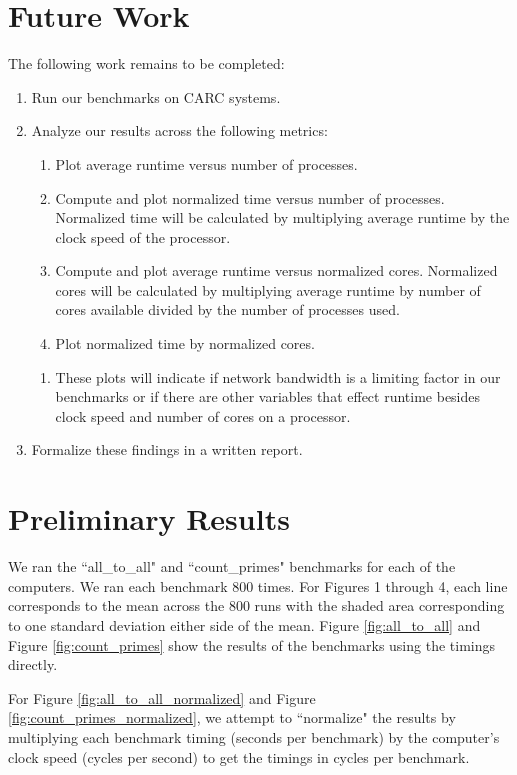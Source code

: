 \documentclass{article}
\begin{document}
\section{Future Work}
The following work remains to be completed:
\begin{enumerate}
    \item Run our benchmarks on CARC systems.
    \item Analyze our results across the following metrics:
    \begin{enumerate}
        \item Plot average runtime versus number of processes.
        \item Compute and plot normalized time versus  number of processes. Normalized time will be calculated by multiplying average runtime by the clock speed of the processor.
        \item Compute and plot average runtime versus normalized cores. Normalized cores will be calculated by multiplying average runtime by number of cores available divided by the number of processes used.
        \item Plot normalized time by normalized cores.
    \end{enumerate}
    \begin{enumerate}
        \item These plots will indicate if network bandwidth is a limiting factor in our benchmarks or if there are other variables that effect runtime besides clock speed and number of cores on a processor.
    \end{enumerate}
    \item Formalize these findings in a written report.
\end{enumerate}

\printbibliography

\section{Preliminary Results}

We ran the ``all\_to\_all" and ``count\_primes" benchmarks for each of the computers. We ran each benchmark 800 times. For Figures 1 through 4, each line corresponds to the mean across the 800 runs with the shaded area corresponding to one standard deviation either side of the mean. Figure \ref{fig:all_to_all} and Figure \ref{fig:count_primes} show the results of the benchmarks using the timings directly. 

For Figure \ref{fig:all_to_all_normalized} and Figure \ref{fig:count_primes_normalized}, we attempt to ``normalize" the results by multiplying each benchmark timing (seconds per benchmark) by the computer's clock speed (cycles per second) to get the timings in cycles per benchmark. 
\end{document}
